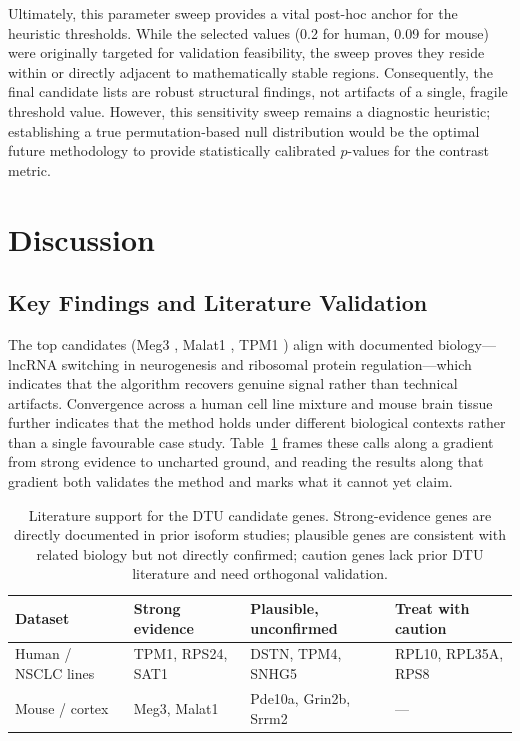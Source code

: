 Ultimately, this parameter sweep provides a vital post-hoc anchor for the heuristic thresholds. While the selected values (0.2 for human, 0.09 for mouse) were originally targeted for validation feasibility, the sweep proves they reside within or directly adjacent to mathematically stable regions. Consequently, the final candidate lists are robust structural findings, not artifacts of a single, fragile threshold value. However, this sensitivity sweep remains a diagnostic heuristic; establishing a true permutation-based null distribution would be the optimal future methodology to provide statistically calibrated $p$-values for the contrast metric.

\section{Discussion}\label{sec:discussion}

\subsection*{Key Findings and Literature Validation}

The top candidates (Meg3 \cite{uroda2019meg3}, Malat1 \cite{ghanam2023malat1}, TPM1 \cite{xue2012specialized}) align with documented biology---lncRNA switching in neurogenesis and ribosomal protein regulation---which indicates that the algorithm recovers genuine signal rather than technical artifacts. Convergence across a human cell line mixture and mouse brain tissue further indicates that the method holds under different biological contexts rather than a single favourable case study. Table~\ref{tab:dtu-validation} frames these calls along a gradient from strong evidence to uncharted ground, and reading the results along that gradient both validates the method and marks what it cannot yet claim.

\begin{table}[htbp]
    \centering
    {\small
    \begin{tabular}{@{}p{2.6cm} p{3.4cm} p{3.4cm} p{3.4cm}@{}}
        \toprule
        Dataset & Strong evidence & Plausible, unconfirmed & Treat with caution \\
        \midrule
        Human / NSCLC lines & TPM1, RPS24, SAT1 & DSTN, TPM4, SNHG5 & RPL10, RPL35A, RPS8 \\
        Mouse / cortex & Meg3, Malat1 & Pde10a, Grin2b, Srrm2 & --- \\
        \bottomrule
    \end{tabular}}
    \caption{Literature support for the DTU candidate genes. Strong-evidence genes are directly documented in prior isoform studies; plausible genes are consistent with related biology but not directly confirmed; caution genes lack prior DTU literature and need orthogonal validation.}
    \label{tab:dtu-validation}
\end{table}

